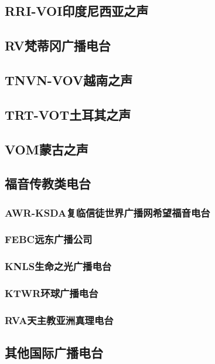 \documentclass[12pt,UTF8]{ctexbook}
\begin{document}
\subsection{RRI-VOI印度尼西亚之声}

\subsection{RV梵蒂冈广播电台}

\subsection{TNVN-VOV越南之声}

\subsection{TRT-VOT土耳其之声}

\subsection{VOM蒙古之声}

\subsection{福音传教类电台}

\subsubsection{AWR-KSDA复临信徒世界广播网希望福音电台}

\subsubsection{FEBC远东广播公司}

\subsubsection{KNLS生命之光广播电台}

\subsubsection{KTWR环球广播电台}

\subsubsection{RVA天主教亚洲真理电台}

\subsection{其他国际广播电台}
\end{document}
